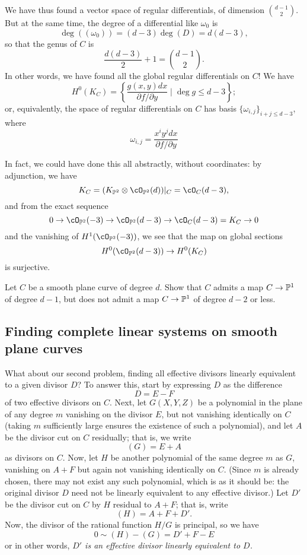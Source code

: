 We have thus found a vector space of regular differentials, of dimension $\binom{d-1}{2}$. But at the same time, the degree of a differential like $\omega_0$ is
$$
\deg((\omega_0)) = (d-3)\deg(D) = d(d-3),
$$
so that the genus of $C$ is 
$$
\frac{d(d-3)}{2} + 1 = \binom{d-1}{2}.
$$
In other words, we have found all the global regular differentials on $C$! We have
$$
H^0(K_C) = \left\{ \frac{g(x,y)dx}{\partial f/\partial y} \mid \deg g \leq d-3\right\};
$$
or, equivalently, the space of regular differentials on $C$ has basis $\{\omega_{i,j} \}_{i+j \leq d-3}$, where
$$
\omega_{i,j} =  \frac{x^iy^jdx}{\partial f/\partial y}
$$

In fact, we could have done this all abstractly, without coordinates: by adjunction, we have
$$
K_C = (K_{\PP^2} \otimes \cO_{\PP^2}(d))|_C = \cO_C(d-3),
$$
and from the exact sequence
$$
0 \to \cO_{\PP^2}(-3) \to \cO_{\PP^2}(d-3) \to \cO_C(d-3)=K_C \to 0
$$
and the vanishing of $H^1(\cO_{\PP^2}(-3))$, we see that the map on global sections
$$
H^0(\cO_{\PP^2}(d-3)) \to H^0(K_C)
$$
is surjective. 

\begin{exercise}\label{gonality of smooth plane curve}
Let $C$ be a smooth plane curve of degree $d$. Show that $C$ admits a map $C \to \PP^1$ of degree $d-1$, but does not admit a map $C \to \PP^1$ of degree $d-2$ or less.
\end{exercise}


\subsection{Finding complete linear systems on smooth plane curves}

What about our second problem, finding all effective divisors linearly equivalent to a given divisor $D$? To answer this, start by expressing $D$ as the difference 
$$
D = E - F
$$
of two effective divisors on $C$. Next, let $G(X,Y,Z)$ be a polynomial in the plane of any degree $m$ vanishing on the divisor $E$, but not vanishing identically on $C$ (taking $m$ sufficiently large ensures the existence of such a polynomial), and let $A$ be the divisor cut on $C$ residually; that is, we write
$$
(G) = E + A
$$
as divisors on $C$. Now, let $H$ be another polynomial of the same degree $m$ as $G$, vanishing on $A + F$ but again not vanishing identically on $C$. (Since $m$ is already chosen, there may not exist any such polynomial, which is as it should be: the original divisor $D$ need not be linearly equivalent to any effective divisor.) Let $D'$ be the divisor cut on $C$ by $H$ residual to $A+F$; that is, write
$$
(H) = A + F + D'.
$$
Now, the divisor of the rational function $H/G$ is principal, so we have
$$
0 \sim (H) - (G) = D' + F - E
$$
or in other words, \emph{$D'$ is an effective divisor linearly equivalent to $D$.}

